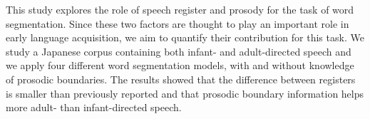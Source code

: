 This study explores the role of speech register and prosody for the task of word segmentation. Since these two factors are thought to play an important role in early language acquisition, we aim to quantify their contribution for this task. We study a Japanese corpus containing both infant- and adult-directed speech and we apply four different word segmentation models, with and without knowledge of prosodic boundaries. The results showed that the difference between registers is smaller than previously reported and that prosodic boundary information helps more adult- than infant-directed speech.

